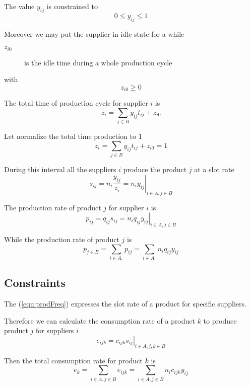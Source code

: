 \documentclass[a4paper,11pt]{article}
\begin{document}
The value $ y_{ij} $ is constrained to 
\begin{equation}
\label{equ:YConstraints}
	0 \le y_{ij} \le 1
\end{equation}

Moreover we may put the supplier in idle state for a while
\begin{description}
	\item[$ z_{i0} $]
		is the idle time during a whole production cycle
\end{description}
with
\begin{equation}
\label{equ:ZConstraints}
	z_{i0} \ge 0
\end{equation}


The total time of production cycle for supplier $ i $ is
	\[ z_i = \sum_{j \in B} y_{ij} t_{ij} + z_{i0} \]

Let normalize the total time production to 1
\begin{equation}
\label{equ:normalInterval}
	z_i = \sum_{j \in B} y_{ij} t_{ij} + z_{i0} = 1
\end{equation}

During this interval all the suppliers $ i $ produce the product $ j $ at a slot rate
\begin{equation}
\label{equ:prodFreq}
\left.
	s_{ij} =  n_i \frac{y_{ij}}{z_i} = n_i y_{ij}
\right| _{i \in A, j \in B}
\end{equation}

The production rate of product $ j $ for supplier $ i $ is
\[
\left.
	p_{ij} = q_{ij} s_{ij} = n_i q_{ij} y_{ij}
\right| _{i \in A, j \in B}
\]

While the production rate of product $ j $ is
\begin{equation}
\label{equ:prodRate}
	p_{j \in B} = \sum_{i \in A,} p_{ij} = 
		\sum_{i \in A,} n_i q_{ij} y_{ij}
\end{equation}


\subsection{Constraints}

The (\ref{equ:prodFreq}) expresses the slot rate of a product for specific suppliers.

Therefore we can calculate the consumption rate of a product $k$ to produce product $ j $ for suppliers $ i $
\[
\left.
	e_{ijk}  = c_{ijk} s_{ij}
\right| _{i \in A, j,k \in B}
\]

Then the total consumption rate for product $ k $ is
\begin{equation}
\label{equ:consumRate}
	e_{k} = \sum_{i \in A, j \in B} e_{ijk}
	= \sum_{i \in A, j \in B} n_i c_{ijk} y_{ij}
\end{equation}
\end{document}
